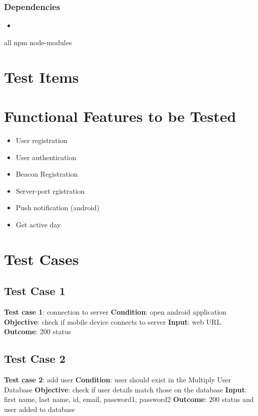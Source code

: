 \documentclass[11pt]{article}
\begin{document}
\subsubsection{Dependencies}
\begin{itemize}
	\item	
\end{itemize}

all npm node-modules
\section{Test Items}
\section{Functional Features to be Tested}
\begin{itemize}
	\item User registration
	\item User authentication
	\item Beacon Registration
	\item Server-port rgistration
	\item Push notification (android)
	\item Get active day
\end{itemize}

\section{Test Cases}
\subsection{Test Case 1}
\textbf{Test case 1}: connection to server \newline
\textbf{Condition}: open android application \newline
\textbf{Objective}: check if mobile device connects to server  \newline
\textbf{Input}: web URL \newline
\textbf{Outcome}:  200 status \newline

\subsection{Test Case 2}
\textbf{Test case 2}: add user \newline
\textbf{Condition}:  user should exist in the Multiply User Database \newline
\textbf{Objective}: check if user details match those on the database\newline
\textbf{Input}: first name, last name, id, email, password1, password2 \newline
\textbf{Outcome}: 200 status and user added to database \newline
\end{document}
